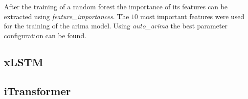 \documentclass[class=scrbook, crop=false]{standalone}
\begin{document}
After the training of a random forest the importance of its features can be extracted using \textit{feature\_importances}. 
The $10$ most important features were used for the training of the arima model.
Using \textit{auto\_arima} the best parameter configuration can be found.

\subsection{xLSTM}
\label{Section::xLSTM}

\subsection{iTransformer}
\label{Section::iTransformer}
\end{document}
